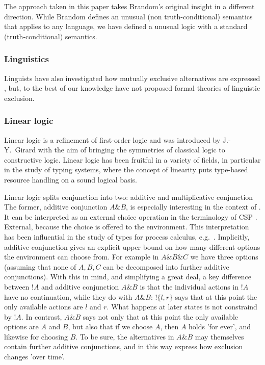 The approach taken in this paper takes Brandom's original insight in a
different direction.  While Brandom defines an unusual (non
truth-conditional) semantics that applies to any language, we have
defined a unusual logic with a standard (truth-conditional) semantics.

\subsubsection{Linguistics}

Linguists have also investigated how mutually exclusive alternatives
are expressed \cite{OKeeffeA:rouhanocl}, but, to the best of our
knowledge have not proposed formal theories of linguistic exclusion.

\subsubsection{Linear logic}

Linear logic \cite{GirardJY:linlog,GirardJY:protyp} is a refinement of
first-order logic and was introduced by J.-Y.~Girard with the aim of
bringing the symmetries of classical logic to constructive
logic. Linear logic has been fruitful in a variety of fields, in
particular in the study of typing systems, where the concept of
linearity puts type-based resource handling on a sound logical basis.

Linear logic splits conjunction into two: additive and multiplicative
conjunction The former, additive conjunction $A \& B$, is especially
interesting in the context of \ELFULL{}. It can be interpreted
\cite{AbramskyS:comintoll} as an external choice operation in the
terminology of CSP \cite{HoareC:comseq}. External, because the choice
is offered to the environment.  This interpretation has been
influential in the study of types for process calculus,
e.g.~\cite{HondaK:unitypsfsifLONG,TakeuchiK:intbaslaits,HondaK:lanpriatdfscbp}.
Implicitly, additive conjunction gives an explicit upper bound on how
many different options the environment can choose from. For example in
$A \& B \& C$ we have three options (assuming that none of $A, B, C$
can be decomposed into further additive conjunctions).  With this in
mind, and simplifying a great deal, a key difference between $!A$ and
additive conjunction $A \& B$ is that the individual actions in $!A$
have no continuation, while they do with $A \& B$: $!\{l, r\}$ says
that at this point the only available actions are $l$ and $r$. What
happens at later states is not constraind by $!A$.  In contrast, $A \&
B$ says not only that at this point the only available options are $A$
and $B$, but also that if we choose $A$, then $A$ holds 'for ever',
and likewise for choosing $B$. To be sure, the alternatives in $A \&
B$ may themselves contain further additive conjunctions, and in this
way express how exclusion changes 'over time'.


